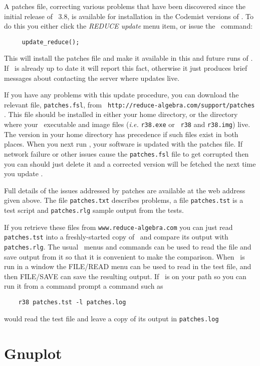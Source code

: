 A patches file, correcting various problems that have been discovered
since the initial release of \REDUCE\ 3.8, is available for installation in
the Codemist versions of \REDUCE.  To do this you either click the
{\em REDUCE update} menu item, or issue the \REDUCE\ command:
\begin{verbatim}
     update_reduce();
\end{verbatim}
This will install the patches file and make it available in this and
future runs of \REDUCE.  If \REDUCE\ is already up to date it will report this
fact, otherwise it just produces brief messages about contacting the
server where updates live.

If you have any problems with this update procedure, you can download
the relevant file, {\tt patches.fsl}, from {\tt
http://reduce-algebra.com/support/patches} .  This file should be
installed in either your home directory, or the directory where your
\REDUCE\ executable and image files ({\em i.e.\/} {\tt r38.exe} or {\tt
r38} and {\tt r38.img}) live.  The version in your home directory has
precedence if such files exist in both places.  When you next run
\REDUCE, your software is updated with the patches file. If network
failure or other issues cause the {\tt patches.fsl} file to get
corrupted then you can should just delete it and a corrected version
will be fetched the next time you update \REDUCE.

Full details of the issues addressed by patches are available at the web
address given above. The file {\tt patches.txt} describes problems, a file
{\tt patches.tst} is a test script and {\tt patches.rlg} sample output
from the tests. 

If you retrieve these files from {\tt www.reduce-algebra.com} you can just read
{\tt patches.tst} into a freshly-started copy of \REDUCE\ and compare its output
with {\tt patches.rlg}.  The usual \REDUCE\ menus and commands can be used to read
the file and save output from it so that it is convenient to make the
comparison.  When \REDUCE\ is run in a window the FILE/READ menu can be used
to read in the test file, and then FILE/SAVE can save the resulting
output.  If \REDUCE\ is on your path so you can run it from a command prompt
a command such as
\begin{verbatim}
    r38 patches.tst -l patches.log
\end{verbatim}
would read the test file and leave a copy of its output in {\tt patches.log}

\section{Gnuplot}


